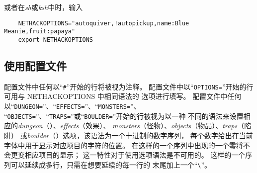 \documentclass[a4paper, 10pt]{article}
\newcommand{\nd}{\noindent}
\begin{document}
\nd 或者在{\it sh\/}或{\it ksh}中时，输入
\begin{verbatim}
    NETHACKOPTIONS="autoquiver,!autopickup,name:Blue Meanie,fruit:papaya"
    export NETHACKOPTIONS
\end{verbatim}


\subsection*{使用配置文件}

配置文件中任何以“{\tt \#}”开始的行将被视为注释。
配置文件中以“{\tt OPTIONS=}”开始的行可用与 NETHACKOPTIONS 中相同语法的
选项进行填写。
配置文件中任何以“{\tt DUNGEON=}”、“{\tt EFFECTS=}”、“{\tt MONSTERS=}”、
“{\tt OBJECTS=}”、“{\tt TRAPS=}”或“{\tt BOULDER=}”开始的行被视为以一种
不同的语法来设置相应的{\it dungeon}（\zhTransDungeon{}）、{\it effects}（效果）、
{\it monsters}（怪物）、{\it objects}（物品）、{\it traps\/}（陷阱）
或{\it boulder\/}（\zhTransBoulders）选项，该语法为一个十进制的数字序列，
每个数字给出在当前字体中用于显示对应项目的字符的位置。
在这样的一个序列中出现的一个零将不会更变相应项目的显示；
这一特性对于使用选项语法是不可用的。
这样的一个序列可以延续成多行，只需在想要延续的每一行的
末尾加上一个“{\tt \verb+\+}”。
\end{document}
